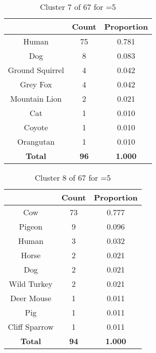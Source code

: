 \begin{table}[ht!]
\centering
\begin{tabular}{|c|c|c|}
\hline
\bf \Spec{} &\bf Count &\bf Proportion\\ \hline \hline
Human & 75 & 0.781\\ \hline
Dog & 8 & 0.083\\ \hline
Ground Squirrel & 4 & 0.042\\ \hline
Grey Fox & 4 & 0.042\\ \hline
Mountain Lion & 2 & 0.021\\ \hline
Cat & 1 & 0.010\\ \hline
Coyote & 1 & 0.010\\ \hline
Orangutan & 1 & 0.010\\ \hline
\hline
\bf Total & \bf 96 & \bf 1.000\\ \hline
\end{tabular}
\label{tab:cluster:7:5}
\caption{Cluster 7 of 67 for \minneigh{}=5}
\end{table}

\begin{table}[ht!]
\centering
\begin{tabular}{|c|c|c|}
\hline
\bf \Spec{} &\bf Count &\bf Proportion\\ \hline \hline
Cow & 73 & 0.777\\ \hline
Pigeon & 9 & 0.096\\ \hline
Human & 3 & 0.032\\ \hline
Horse & 2 & 0.021\\ \hline
Dog & 2 & 0.021\\ \hline
Wild Turkey & 2 & 0.021\\ \hline
Deer Mouse & 1 & 0.011\\ \hline
Pig & 1 & 0.011\\ \hline
Cliff Sparrow & 1 & 0.011\\ \hline
\hline
\bf Total & \bf 94 & \bf 1.000\\ \hline
\end{tabular}
\label{tab:cluster:8:5}
\caption{Cluster 8 of 67 for \minneigh{}=5}
\end{table}

